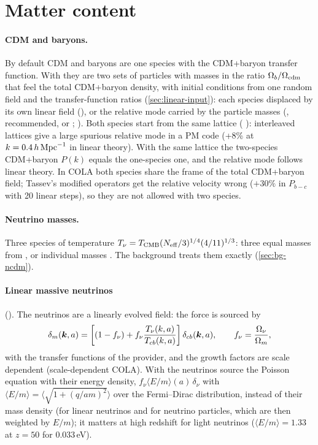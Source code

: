\section{Matter content}\label{sec:sim-species}

\paragraph*{CDM and baryons.} By default CDM and baryons are one species with the CDM+baryon transfer function. With
 they are two sets of particles with masses in the ratio $\Omega_b/\Omega_{\rm cdm}$ that feel the
total CDM+baryon density, with initial conditions from one random field and the transfer-function ratios
(\cref{sec:linear-input}): each species displaced by its own linear field (), or the relative mode
carried by the particle masses (, recommended, or ; ).
Both species start from the same lattice ( ): interleaved lattices give a
large spurious relative mode in a PM code (+8\% at $k=0.4\,h\,\mathrm{Mpc}^{-1}$ in linear theory). With the same lattice the
two-species CDM+baryon $P(k)$ equals the one-species one, and the relative mode follows linear theory. In COLA both
species share the frame of the total CDM+baryon field; Tassev's modified operators get the relative velocity wrong
($+30\%$ in $P_{b-c}$ with 20 linear steps), so they are not allowed with two species.

\paragraph*{Neutrino masses.} Three species of temperature $T_\nu=T_{\rm CMB}(N_{\rm eff}/3)^{1/4}(4/11)^{1/3}$:
three equal masses from , or individual masses . The
background treats them exactly (\cref{sec:bg-ncdm}).

\paragraph*{Linear massive neutrinos} (). The neutrinos are a linearly evolved
field: the force is sourced by
\begin{equation}
\delta_m(\bm{k},a)=\left[(1-f_\nu)+f_\nu\frac{T_\nu(k,a)}{T_{cb}(k,a)}\right]\delta_{cb}(\bm{k},a),\qquad f_\nu=\frac{\Omega_\nu}{\Omega_m},
\end{equation}
with the transfer functions of the provider, and the growth factors are scale dependent (scale-dependent COLA).
With  the neutrinos source the Poisson equation with their energy density,
$f_\nu\langle E/m\rangle(a)\,\delta_\nu$ with $\langle E/m\rangle=\langle\sqrt{1+(q/am)^2}\rangle$ over the Fermi--Dirac
distribution, instead of their mass density (for linear neutrinos and for neutrino particles, which are then weighted by
$E/m$); it matters at high redshift for light neutrinos ($\langle E/m\rangle=1.33$ at $z=50$ for 0.033\,eV).

